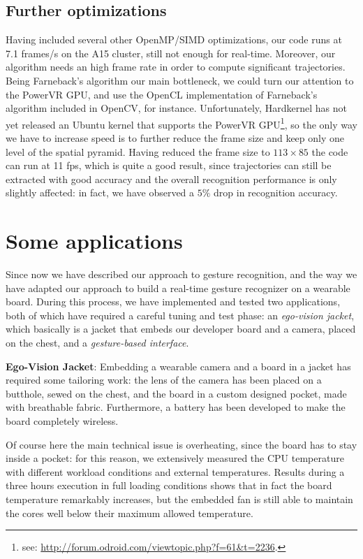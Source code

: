 \subsection{Further optimizations}
Having included several other OpenMP/SIMD optimizations, our code runs at 7.1 frames/s on the A15 cluster, still not enough for real-time. Moreover, our algorithm needs an high frame rate in order to compute significant trajectories. Being Farneback's algorithm our main bottleneck, we could turn our attention to the PowerVR GPU, and use the OpenCL implementation of Farneback's algorithm included in OpenCV, for instance. Unfortunately, Hardkernel has not yet released an Ubuntu kernel that supports the PowerVR GPU\footnote{see: \url{http://forum.odroid.com/viewtopic.php?f=61&t=2236}.}, so the only way we have to increase speed is to further reduce the frame size and keep only one level of the spatial pyramid. Having reduced the frame size to $113\times 85$ the code can run at 11 fps, which is quite a good result, since trajectories can still be extracted with good accuracy and the overall recognition performance is only slightly affected: in fact, we have observed a $5\%$ drop in recognition accuracy.

\section{Some applications}
Since now we have described our approach to gesture recognition, and the way we have adapted our approach to build a real-time gesture recognizer on a wearable board. During this process, we have implemented and tested two applications, both of which have required a careful tuning and test phase: an \textit{ego-vision jacket}, which basically is a jacket that embeds our developer board and a camera, placed on the chest, and a \textit{gesture-based interface}.

\textbf{Ego-Vision Jacket}: Embedding a wearable camera and a board in a jacket has required some tailoring work: the lens of the camera has been placed on a butthole, sewed on the chest, and the board in a custom designed pocket, made with breathable fabric. Furthermore, a battery has been developed to make the board completely wireless. 

Of course here the main technical issue is overheating, since the board has to stay inside a pocket: for this reason, we extensively measured the CPU temperature with different workload conditions and external temperatures. Results during a three hours execution in full loading conditions shows that in fact the board temperature remarkably increases, but the embedded fan is still able to maintain the cores well below their maximum allowed temperature.

